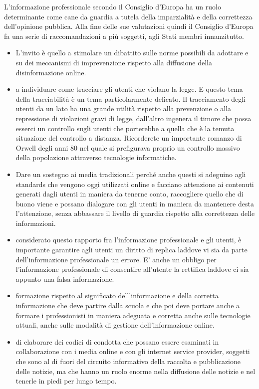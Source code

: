 L'informazione professionale secondo il Consiglio d'Europa ha un ruolo determinante come cane da guardia a tutela della imparzialità e della correttezza dell'opinione pubblica. Alla fine delle sue valutazioni quindi il Consiglio d'Europa fa una serie di raccomandazioni a più soggetti, agli Stati membri innanzitutto. 
\begin{itemize}
    \item L'invito è quello a stimolare un dibattito sulle norme possibili da adottare e su dei meccanismi di imprevenzione rispetto alla diffusione della disinformazione online.
    \item a individuare come tracciare gli utenti che violano la legge. E questo tema della tracciabilità è un tema particolarmente delicato. Il tracciamento degli utenti da un lato ha una grande utilità rispetto alla prevenzione o alla repressione di violazioni gravi di legge, dall'altro ingenera il timore che possa esserci un controllo sugli utenti che porterebbe a quella che è la temuta situazione del controllo a distanza. Ricorderete un importante romanzo di Orwell degli anni 80 nel quale si prefigurava proprio un controllo massivo della popolazione attraverso tecnologie informatiche.
    \item Dare un sostegno ai media tradizionali perché anche questi si adeguino agli standards che vengono oggi utilizzati online e facciano attenzione ai contenuti generati dagli utenti in maniera da tenerne conto, raccogliere quello che di buono viene e possano dialogare con gli utenti in maniera da mantenere desta l'attenzione, senza abbassare il livello di guardia rispetto alla correttezza delle informazioni.
    \item considerato questo rapporto fra l'informazione professionale e gli utenti, è importante garantire agli utenti un diritto di replica laddove vi sia da parte dell'informazione professionale un errore. E' anche un obbligo per l'informazione professionale di consentire all'utente la rettifica laddove ci sia appunto una falsa informazione.
    \item formazione rispetto al significato dell'informazione e della corretta informazione che deve partire dalla scuola e che poi deve portare anche a formare i professionisti in maniera adeguata e corretta anche sulle tecnologie attuali, anche sulle modalità di gestione dell'informazione online.
    \item di elaborare dei codici di condotta che possano essere esaminati in collaborazione con i media online e con gli internet service provider, soggetti che sono al di fuori del circuito informativo della raccolta e pubblicazione delle notizie, ma che hanno un ruolo enorme nella diffusione delle notizie e nel tenerle in piedi per lungo tempo.

\end{itemize}

